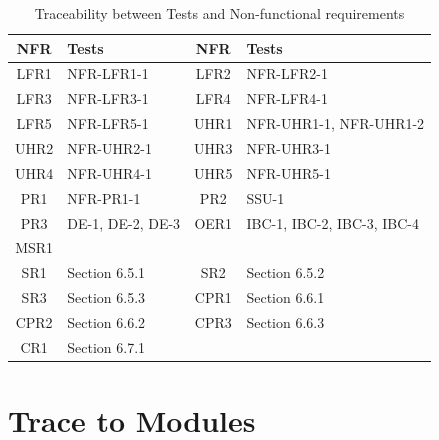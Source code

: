 \documentclass[12pt, titlepage]{article}
\begin{document}
    \begin{table}[H]
        \centering
        \begin{tabularx}{\textwidth}{|c|X|c|X|}
            \hline
            \textbf{NFR} & \textbf{Tests} & \textbf{NFR} & \textbf{Tests} \\ \hline
            LFR1 & NFR-LFR1-1 & LFR2 & NFR-LFR2-1 \\ \hline
            LFR3 & NFR-LFR3-1 & LFR4 & NFR-LFR4-1 \\ \hline
            LFR5 & NFR-LFR5-1 & UHR1 & NFR-UHR1-1, NFR-UHR1-2 \\ \hline
            UHR2 & NFR-UHR2-1 & UHR3 & NFR-UHR3-1 \\ \hline
            UHR4 & NFR-UHR4-1 & UHR5 & NFR-UHR5-1 \\ \hline
            PR1 & NFR-PR1-1 & PR2 & SSU-1 \\ \hline
            PR3 & DE-1, DE-2, DE-3 & OER1 & IBC-1, IBC-2, IBC-3, IBC-4 \\ \hline
            MSR1 & & & \\ \hline
            SR1 & Section 6.5.1 & SR2 & Section 6.5.2 \\ \hline
            SR3 & Section 6.5.3 & CPR1 & Section 6.6.1 \\ \hline
            CPR2 & Section 6.6.2 & CPR3 & Section 6.6.3 \\ \hline
            CR1 & Section 6.7.1 & & \\ \hline
        \end{tabularx}
        \caption{Traceability between Tests and Non-functional requirements}
        \label{tab:nfrtrace}
    \end{table}

\newpage
\section{Trace to Modules}
\end{document}
